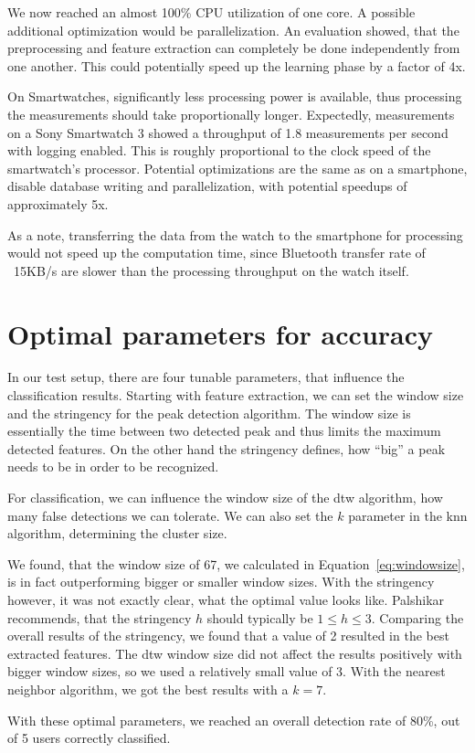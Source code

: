 We now reached an almost 100\% CPU utilization of one core. A possible additional optimization would be parallelization. An evaluation showed, that the preprocessing and feature extraction can completely be done independently from one another. This could potentially speed up the learning phase by a factor of 4x.

On Smartwatches, significantly less processing power is available, thus processing the measurements should take proportionally longer. Expectedly, measurements on a Sony Smartwatch 3 showed a throughput of 1.8 measurements per second with logging enabled. This is roughly proportional to the clock speed of the smartwatch's processor. Potential optimizations are the same as on a smartphone, \ie disable database writing and parallelization, with potential speedups of approximately 5x. 

As a note, transferring the data from the watch to the smartphone for processing would not speed up the computation time, since Bluetooth transfer rate of ~15KB/s are slower than the processing throughput on the watch itself.

\section{Optimal parameters for accuracy}
In our test setup, there are four tunable parameters, that influence the classification results. Starting with feature extraction, we can set the window size and the stringency for the peak detection algorithm. The window size is essentially the time between two detected peak and thus limits the maximum detected features. On the other hand the stringency defines, how ``big'' a peak needs to be in order to be recognized.

For classification, we can influence the window size of the \gls{dtw} algorithm, \ie how many false detections we can tolerate. We can also set the $k$ parameter in the \gls{knn} algorithm, determining the cluster size.

We found, that the window size of 67, we calculated in Equation~\ref{eq:windowsize}, is in fact outperforming bigger or smaller window sizes. With the stringency however, it was not exactly clear, what the optimal value looks like. Palshikar \cite{palshikar2009simple} recommends, that the stringency $h$ should typically be $1 \leq h \leq 3$. Comparing the overall results of the stringency, we found that a value of 2 resulted in the best extracted features. The \gls{dtw} window size did not affect the results positively with bigger window sizes, so we used a relatively small value of 3. With the nearest neighbor algorithm, we got the best results with a $k = 7$.

With these optimal parameters, we reached an overall detection rate of 80\%,  out of 5 users correctly classified.